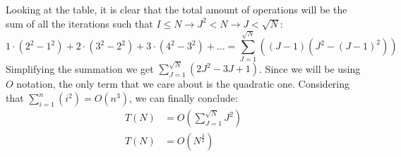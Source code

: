 \documentclass{article}
\begin{document}
\begin{enumerate}[1.]
\begin{enumerate}[(a)]
             Looking at the table, it is clear that the total amount of operations will be the sum of all the iterations such that $I \leq N \rightarrow J^2 < N \rightarrow J < \sqrt{N}$:
             \begin{equation*}
                 1\cdot(2^2-1^2)+2\cdot(3^2-2^2)+3\cdot(4^2-3^2)+\ldots = \sum_{J=1}^{\sqrt{N}}\left((J-1)(J^2 - (J-1)^2)\right)
             \end{equation*}
             Simplifying the summation we get $\sum_{J=1}^{\sqrt{N}}\left(2J^2-3J+1\right)$. Since we will be using $O$ notation, the only term that we care about is the quadratic one. Considering that $\sum_{i=1}^n(i^2) = O(n^3)$, we can finally conclude:
             \begin{align*}
                 T(N) &= O\left(\sum_{J=1}^{\sqrt{N}}J^2\right)\\
                 T(N) &= O\left(N^{\frac{3}{2}}\right)
             \end{align*}
             

\end{enumerate}
\end{enumerate}
\end{document}
